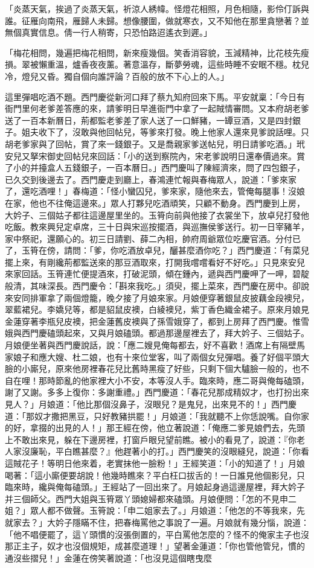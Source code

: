 「炎蒸天氣，挨過了炎蒸天氣，祈涼人綉幃。怪燈花相照，月色相隨，影伶仃訴與誰。征雁向南飛，雁歸人未歸。想像腰圍，做就寒衣，又不知他在那里貪戀著？並無個真實信息。倩一行人稍寄，只恐怕路迢遙衣到遲。」

「梅花相問，幾遍把梅花相問，新來瘦幾個。笑香消容貌，玉減精神，比花枝先瘦損。翠被懶重溫，爐香夜夜薰。著意溫存，斷夢勞魂，這些時睡不安眠不穩。枕兒冷，燈兒又昏。獨自個向誰評論？百般的放不下心上的人。」

這里彈唱吃酒不題。西門慶從新河口拜了蔡九知府回來下馬。平安就稟：「今日有衙門里何老爹差答應的來，請爹明日早進衙門中拿了一起賊情審問。又本府胡老爹送了一百本新曆日，荊都監老爹差了家人送了一口鮮豬，一罈豆酒，又是四封銀子。姐夫收下了，沒敢與他回帖兒，等爹來打發。晚上他家人還來見爹說話哩。只胡老爹家與了回帖，賞了來一錢銀子。又是喬親家爹送帖兒，明日請爹吃酒。」玳安兒又拏宋御史回帖兒來回話：「小的送到察院內，宋老爹說明日還奉價過來。賞了小的并擡盒人五錢銀子，一百本曆日。」西門慶叫了陳經濟來，問了四包銀子，已久交到後邊去了。西門慶走到廳上，春鴻連忙報與春梅眾人，說道：「爹來家了，還吃酒哩！」春梅道：「怪小蠻囚兒，爹來家，隨他來去，管俺每腿事！沒娘在家，他也不往俺這邊來。」眾人打夥兒吃酒頑笑，只顧不動身。西門慶到上房，大妗子、三個姑子都往這邊屋里坐的。玉筲向前與他接了衣裳坐下，放卓兒打發他吃飯。教來興兒定卓席，三十日與宋巡按擺酒，與巡撫侯爹送行。初一日宰豬羊，家中祭祀，還願心的。初三日請劉、薛二內相，帥府周爺眾位吃慶官酒。分付已了，玉筲在傍，請問：「爹，你吃酒放卓兒，釃甚麼酒你吃？」西門慶道：「有菜兒擺上來，有剛纔荊都監送來的那豆酒取來，打開我嚐嚐看好不好吃。」只見來安兒來家回話。玉筲連忙便提酒來，打破泥頭，傾在鍾內，遞與西門慶呷了一呷，碧靛般清，其味深長。西門慶令：「斟來我吃。」須臾，擺上菜來，西門慶在房中。卻說來安同排軍拿了兩個燈籠，晚夕接了月娘來家。月娘便穿著銀鼠皮披藕金段襖兒，翠藍裙兒。李嬌兒等，都是貂鼠皮襖，白綾襖兒，紫丁香色織金裙子。原來月娘見金蓮穿著李瓶兒皮襖，把金蓮舊皮襖與了孫雪娥穿了，都到上房拜了西門慶。惟雪娥與西門慶磕頭起來，又與月娘磕頭。都過那邊屋裡去了，拜大妗子、三個姑子。月娘便坐著與西門慶說話，說：「應二嫂見俺每都去，好不喜歡！酒席上有隔壁馬家娘子和應大嫂、杜二娘，也有十來位堂客，叫了兩個女兒彈唱。養了好個平頭大臉的小廝兒，原來他房裡春花兒比舊時黑瘦了好些，只剩下個大驢臉一般的，也不自在哩！那時節亂的他家裡大小不安，本等沒人手。臨來時，應二哥與俺每磕頭，謝了又謝。多多上復你：多謝重禮。」西門慶道：「春花兒那成精奴才，也打扮出來見人？」月娘道：「他比那個沒鼻子，沒眼兒？是鬼兒，出來見不的！」西門慶道：「那奴才撒把黑豆，只好教豬拱罷！」月娘道：「我就聽不上你恁說嘴。自你家的好，拿掇的出見的人！」那王經在傍，他立著說道：「俺應二爹見娘們去，先頭上不敢出來見，躲在下邊房裡，打窗戶眼兒望前瞧。被小的看見了，說道：『你老人家沒廉恥，平白瞧甚麼？』他趕著小的打。」西門慶笑的沒眼縫兒，說道：「你看這賊花子！等明日他來着，老實抹他一臉粉！」王經笑道：「小的知道了！」月娘喝著：「這小廝便要胡說！他幾時瞧來？平白枉口拔舌的！一日誰見他個影兒，只臨來時，纔與俺每磕頭。」王經站了一回出來了。月娘起身過這邊屋裡，拜大妗子并三個師父。西門大姐與玉筲眾丫頭媳婦都來磕頭。月娘便問：「怎的不見申二姐？」眾人都不做聲。玉筲說：「申二姐家去了。」月娘道：「他怎的不等我來，先就家去？」大妗子隱瞞不住，把春梅罵他之事說了一遍。月娘就有幾分惱，說道：「他不唱便罷了，這丫頭慣的沒張倒置的，平白罵他怎麼的？怪不的俺家主子也沒那正主子，奴才也沒個規矩，成甚麼道理！」望著金蓮道：「你也管他管兒，慣的通沒些摺兒！」金蓮在傍笑著說道：「也沒見這個瞎曳麼